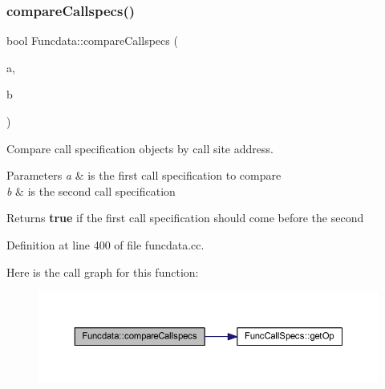 \subsubsection{\texorpdfstring{compareCallspecs()}{compareCallspecs()}}
{\footnotesize\ttfamily bool Funcdata\+::compare\+Callspecs (\begin{DoxyParamCaption}\item[{const \mbox{\hyperlink{class_func_call_specs}{Func\+Call\+Specs}} $\ast$}]{a,  }\item[{const \mbox{\hyperlink{class_func_call_specs}{Func\+Call\+Specs}} $\ast$}]{b }\end{DoxyParamCaption})\hspace{0.3cm}{\ttfamily [static]}}



Compare call specification objects by call site address. 


\begin{DoxyParams}{Parameters}
{\em a} & is the first call specification to compare \\
\hline
{\em b} & is the second call specification \\
\hline
\end{DoxyParams}
\begin{DoxyReturn}{Returns}
{\bfseries{true}} if the first call specification should come before the second 
\end{DoxyReturn}


Definition at line 400 of file funcdata.\+cc.

Here is the call graph for this function\+:
\nopagebreak
\begin{figure}[H]
\begin{center}
\leavevmode
\includegraphics[width=350pt]{class_funcdata_a4456bfc523a4527c9fd924ecadacec63_cgraph}
\end{center}
\end{figure}
\mbox{\label{class_funcdata_a65e8837c811e309578d2828486bcafb5}} 
